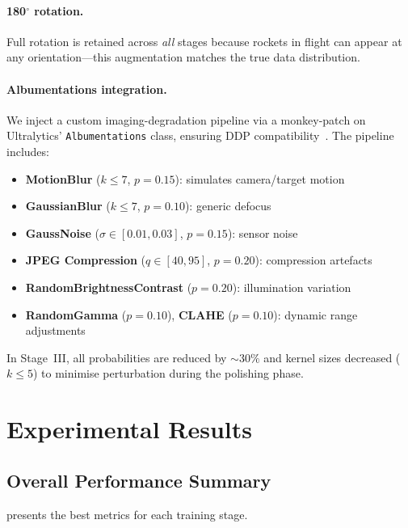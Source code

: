 \documentclass[11pt, a4paper]{article}
\begin{document}
\paragraph{180$^{\circ}$ rotation.}  Full rotation is retained across
\emph{all} stages because rockets in flight can appear at any
orientation---this augmentation matches the true data distribution.

\paragraph{Albumentations integration.}
We inject a custom imaging-degradation pipeline via a monkey-patch on
Ultralytics' \texttt{Albumentations} class, ensuring DDP
compatibility~\cite{buslaev2020albumentations}. The pipeline includes:

\begin{itemize}[leftmargin=*, itemsep=1pt]
  \item \textbf{MotionBlur} ($k{\leq}7$, $p{=}0.15$): simulates
        camera/target motion
  \item \textbf{GaussianBlur} ($k{\leq}7$, $p{=}0.10$): generic
        defocus
  \item \textbf{GaussNoise} ($\sigma \in [0.01, 0.03]$, $p{=}0.15$):
        sensor noise
  \item \textbf{JPEG Compression} ($q \in [40, 95]$, $p{=}0.20$):
        compression artefacts
  \item \textbf{RandomBrightnessContrast} ($p{=}0.20$): illumination
        variation
  \item \textbf{RandomGamma} ($p{=}0.10$), \textbf{CLAHE}
        ($p{=}0.10$): dynamic range adjustments
\end{itemize}

In Stage~III, all probabilities are reduced by ${\sim}30\%$ and kernel sizes
decreased ($k{\leq}5$) to minimise perturbation during the polishing phase.

\section{Experimental Results}
\label{sec:results}

\subsection{Overall Performance Summary}

 presents the best metrics for each training stage.
\end{document}
